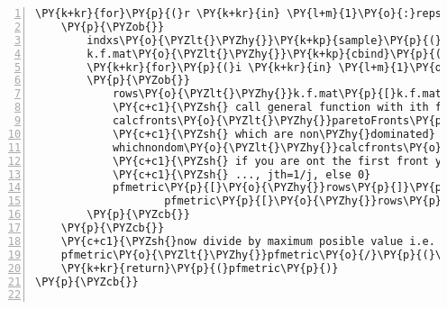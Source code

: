 \begin{Verbatim}[commandchars=\\\{\},codes={\catcode`\$=3\catcode`\^=7\catcode`\_=8},gobble=0,numbers=left,fontfamily=fvm,fontshape=n,fontsize=\footnotesize,tabsize=2]
	\PY{k+kr}{for}\PY{p}{(}r \PY{k+kr}{in} \PY{l+m}{1}\PY{o}{:}reps\PY{p}{)}
	\PY{p}{\PYZob{}}
		indxs\PY{o}{\PYZlt{}\PYZhy{}}\PY{k+kp}{sample}\PY{p}{(}\PY{l+m}{1}\PY{o}{:}n\PY{p}{)} \PY{c+c1}{\PYZsh{}fresh randomisation each repetition}
		k.f.mat\PY{o}{\PYZlt{}\PYZhy{}}\PY{k+kp}{cbind}\PY{p}{(}indxs\PY{p}{,}block.nos\PY{p}{)} \PY{c+c1}{\PYZsh{} create the fold \PYZsq{}blocks\PYZsq{} of data}
		\PY{k+kr}{for}\PY{p}{(}i \PY{k+kr}{in} \PY{l+m}{1}\PY{o}{:}nfolds\PY{p}{)}
		\PY{p}{\PYZob{}}
			rows\PY{o}{\PYZlt{}\PYZhy{}}k.f.mat\PY{p}{[}k.f.mat\PY{p}{[}\PY{p}{,}\PY{l+m}{2}\PY{p}{]}\PY{o}{==}i\PY{p}{,}\PY{l+m}{1}\PY{p}{]} \PY{c+c1}{\PYZsh{} find the ith fold to leave out}
			\PY{c+c1}{\PYZsh{} call general function with ith fold removed}
			calcfronts\PY{o}{\PYZlt{}\PYZhy{}}paretoFronts\PY{p}{(}noFronts\PY{p}{,}objmatrix\PY{p}{[}\PY{o}{\PYZhy{}}rows\PY{p}{,}\PY{p}{]}\PY{p}{,}\PY{k+kp}{rep}\PY{p}{(}\PY{k+kc}{FALSE}\PY{p}{,}m\PY{p}{)}\PY{p}{)}
			\PY{c+c1}{\PYZsh{} which are non\PYZhy{}dominated}
			whichnondom\PY{o}{\PYZlt{}\PYZhy{}}calcfronts\PY{o}{\PYZgt{}}\PY{l+m}{0}
			\PY{c+c1}{\PYZsh{} if you are ont the first front you get 1, second=1/2, third=1/3,}
			\PY{c+c1}{\PYZsh{} ..., jth=1/j, else 0}
			pfmetric\PY{p}{[}\PY{o}{\PYZhy{}}rows\PY{p}{]}\PY{p}{[}whichnondom\PY{p}{]}\PY{o}{\PYZlt{}\PYZhy{}}
					pfmetric\PY{p}{[}\PY{o}{\PYZhy{}}rows\PY{p}{]}\PY{p}{[}whichnondom\PY{p}{]}\PY{l+m}{+1}\PY{o}{/}calcfronts\PY{p}{[}whichnondom\PY{p}{]}
		\PY{p}{\PYZcb{}}
	\PY{p}{\PYZcb{}}
	\PY{c+c1}{\PYZsh{}now divide by maximum posible value i.e. (nfolds\PYZhy{}1)*reps so output in [0,1]}
	pfmetric\PY{o}{\PYZlt{}\PYZhy{}}pfmetric\PY{o}{/}\PY{p}{(}\PY{p}{(}nfolds\PY{l+m}{\PYZhy{}1}\PY{p}{)}\PY{o}{*}reps\PY{p}{)} 
	\PY{k+kr}{return}\PY{p}{(}pfmetric\PY{p}{)}
\PY{p}{\PYZcb{}}


\end{Verbatim}
